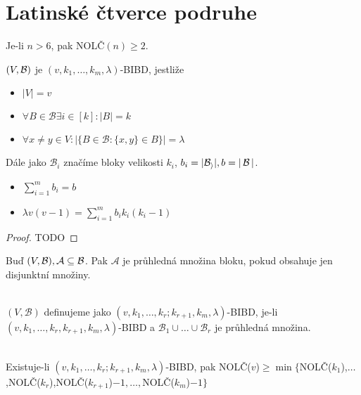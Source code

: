 \section{\texorpdfstring{Latinské čtverce podruhe}{Latinské čtverce podruhe}}

\begin{theorem}
    Je-li $n>6$, pak NOLČ$(n)\geq 2$.
\end{theorem}
\begin{definition}
    $(V,\operatorname{\mathcal{B}})$ je $(v,k_1,\ldots,k_m,\lambda)$-BIBD, jestliže
    \begin{itemize}
        \item $|V| = v$
        \item $\forall B\in\mathcal{B}\exists i \in[k]: |B|=k$
        \item $\forall x\neq y\in V: |\{B\in\mathcal{B}: \{x,y\}\in B\}|=\lambda$
    \end{itemize}

    Dále jako $\mathcal{B}_i$ značíme bloky velikosti $k_i$, $b_i=|\mathcal{B_i}|, b=|\operatorname{\mathcal{B}}|$.
\end{definition}
\begin{note}
    \begin{itemize}
        \item $\sum_{i=1}^mb_i=b$
        \item $\lambda v(v-1)=\sum_{i=1}^m b_ik_i(k_i-1)$
    \end{itemize}
\end{note}
\begin{proof}
    TODO
\end{proof}
\begin{definition}
    Buď $(V,\operatorname{\mathcal{B}}), \mathcal{A}\subseteq \operatorname{\mathcal{B}}$.
    Pak $\mathcal{A}$ je průhledná množina bloku, pokud obsahuje jen disjunktní množiny.
\end{definition}
\begin{definition}~\\
    $(V,\mathcal{B})$ definujeme jako $(v,k_1,\ldots,k_r;k_{r+1},k_m,\lambda)$-BIBD, je-li $(v,k_1,\ldots,k_r,k_{r+1},k_m,\lambda)$-BIBD a $\mathcal{B}_1\cup\ldots\cup\mathcal{B}_r$ je průhledná množina.
\end{definition}
\begin{theorem}~\\
    Existuje-li $(v,k_1,\ldots,k_r;k_{r+1},k_m,\lambda)$-BIBD, pak NOLČ($v$)$\geq\min\{$NOLČ($k_1$),$\ldots$,NOLČ($k_r$),NOLČ($k_{r+1}$)$-1,\ldots,$NOLČ($k_m$)$-1\}$
\end{theorem}
